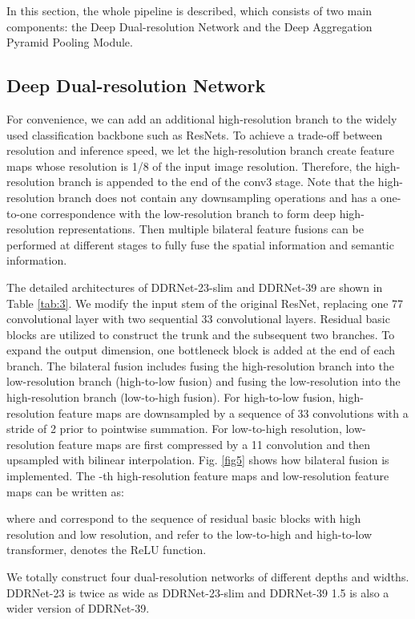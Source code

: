 \documentclass[journal]{IEEEtran}
\begin{document}
In this section, the whole pipeline is described, which consists of two main components: the Deep Dual-resolution Network and the Deep Aggregation Pyramid Pooling Module.

\subsection{Deep Dual-resolution Network}

For convenience, we can add an additional high-resolution branch to the widely used classification backbone such as ResNets. To achieve a trade-off between resolution and inference speed, we let the high-resolution branch create feature maps whose resolution is 1/8 of the input image resolution. Therefore, the high-resolution branch is appended to the end of the conv3 stage. Note that the high-resolution branch does not contain any downsampling operations and has a one-to-one correspondence with the low-resolution branch to form deep high-resolution representations. Then multiple bilateral feature fusions can be performed at different stages to fully fuse the spatial information and semantic information.

The detailed architectures of DDRNet-23-slim and DDRNet-39 are shown in Table \ref{tab:3}. We modify the input stem of the original ResNet, replacing one 77 convolutional layer with two sequential 33 convolutional layers. Residual basic blocks are utilized to construct the trunk and the subsequent two branches. To expand the output dimension, one bottleneck block is added at the end of each branch. The bilateral fusion includes fusing the high-resolution branch into the low-resolution branch (high-to-low fusion) and fusing the low-resolution into the high-resolution branch (low-to-high fusion). For high-to-low fusion, high-resolution feature maps are downsampled by a sequence of 33 convolutions with a stride of 2 prior to pointwise summation. For low-to-high resolution, low-resolution feature maps are first compressed by a 11 convolution and then upsampled with bilinear interpolation. Fig. \ref{fig5} shows how bilateral fusion is implemented. The -th high-resolution feature maps  and low-resolution feature maps  can be written as:

where  and  correspond to the sequence of residual basic blocks with high resolution and low resolution,  and  refer to the low-to-high and high-to-low transformer,  denotes the ReLU function.

We totally construct four dual-resolution networks of different depths and widths. DDRNet-23 is twice as wide as DDRNet-23-slim and DDRNet-39 1.5 is also a wider version of DDRNet-39.
\end{document}
